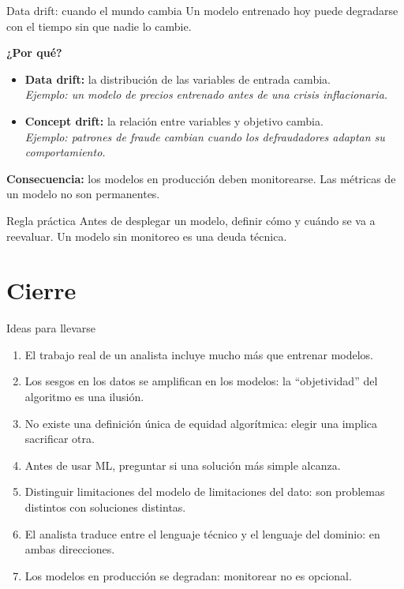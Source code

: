 \documentclass[aspectratio=169]{beamer}
\begin{document}
\begin{frame}{Data drift: cuando el mundo cambia}
  Un modelo entrenado hoy puede degradarse con el tiempo sin que nadie lo cambie.

  \bigskip
  \textbf{¿Por qué?}
  \begin{itemize}
    \item \textbf{Data drift:} la distribución de las variables de entrada cambia. \\
    \textit{Ejemplo: un modelo de precios entrenado antes de una crisis inflacionaria.}
    \item \textbf{Concept drift:} la relación entre variables y objetivo cambia. \\
    \textit{Ejemplo: patrones de fraude cambian cuando los defraudadores adaptan su comportamiento.}
  \end{itemize}

  \bigskip
  \textbf{Consecuencia:} los modelos en producción deben monitorearse. Las métricas de un modelo no son permanentes.

  \bigskip
  \begin{alertblock}{Regla práctica}
    Antes de desplegar un modelo, definir cómo y cuándo se va a reevaluar. Un modelo sin monitoreo es una deuda técnica.
  \end{alertblock}
\end{frame}

\section{Cierre}

\begin{frame}{Ideas para llevarse}
  \begin{enumerate}
    \item El trabajo real de un analista incluye mucho más que entrenar modelos.
    \item Los sesgos en los datos se amplifican en los modelos: la ``objetividad'' del algoritmo es una ilusión.
    \item No existe una definición única de equidad algorítmica: elegir una implica sacrificar otra.
    \item Antes de usar ML, preguntar si una solución más simple alcanza.
    \item Distinguir limitaciones del modelo de limitaciones del dato: son problemas distintos con soluciones distintas.
    \item El analista traduce entre el lenguaje técnico y el lenguaje del dominio: en ambas direcciones.
    \item Los modelos en producción se degradan: monitorear no es opcional.
  \end{enumerate}
\end{frame}
\end{document}
